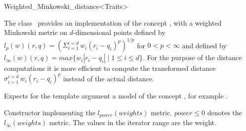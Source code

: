 

\begin{ccRefClass}{Weighted_Minkowski_distance<Traits>}  %


\ccDefinition
   
The class \ccRefName\ provides an implementation of the concept , with a weighted 
Minkowski metric on $d$-dimensional points
defined by $l_p(w)(r,q)= ({\Sigma_{i=1}^{i=d} \, w_i(r_i-q_i)^p})^{1/p}$ for $0 < p <\infty$ and
defined by $l_{\infty}(w)(r,q)=max \{w_i |r_i-q_i| \mid 1 \leq i \leq d\}$.
For the purpose of the distance computations it is more efficient to compute
the transformed distance ${\sigma_{i=1}^{i=d} \, w_i(r_i-q_i)^p}$ instead of the actual distance.


\ccParameters

Expects for the template argument a model of the concept
, for example .

\ccIsModel


\ccTypes


 

\ccCreation
{}  %


{Constructor implementing the $l_{power}(weights)$ metric. $power \leq 0$ denotes the $l_{\infty}(weights)$ metric.
The values in the iterator range \ccc{[wb,we)} are the weight. }


\end{ccRefClass}
